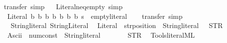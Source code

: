 \begin{isabellebody}
\ transfer\ simp\isanewline
\isanewline
{}%
\endisatagproof
{\isafoldproof}%
%
\isadelimproof
%
\endisadelimproof
\ \isamarkupfalse%
\ Literal{\isacharunderscore}{\kern0pt}neq{\isacharunderscore}{\kern0pt}empty\ {\isacharbrackleft}{\kern0pt}simp{\isacharbrackright}{\kern0pt}{\isacharcolon}{\kern0pt}\isanewline
\ \ {\isachardoublequoteopen}Literal\ b{}\ b{}\ b{}\ b{}\ b{}\ b{}\ b{}\ s\ {\isasymnoteq}\ empty{\isacharunderscore}{\kern0pt}literal{\isachardoublequoteclose}\isanewline
%
\isadelimproof
\ \ %
\endisadelimproof
%
\isatagproof
{}\isamarkupfalse%
\ transfer\ simp%
\endisatagproof
{\isafoldproof}%
%
\isadelimproof
\isanewline
%
\endisadelimproof
\isanewline
{}\isamarkupfalse%
\isanewline
\isanewline
{}\isamarkupfalse%
\ {\isachardoublequoteopen}{}\ {\isacharcolon}{\kern0pt}{\isacharcolon}{\kern0pt}\ String{\isachardot}{\kern0pt}literal{\isachardoublequoteclose}\ String{\isachardot}{\kern0pt}Literal\isanewline
\isanewline
{}\isamarkupfalse%
\isanewline
\ \ {\isachardoublequoteopen}{\isacharunderscore}{\kern0pt}Literal{\isachardoublequoteclose}\ {\isacharcolon}{\kern0pt}{\isacharcolon}{\kern0pt}\ {\isachardoublequoteopen}str{\isacharunderscore}{\kern0pt}position\ {\isasymRightarrow}\ String{\isachardot}{\kern0pt}literal{\isachardoublequoteclose}\ \ \ {\isacharparenleft}{\kern0pt}{\isachardoublequoteopen}STR\ {\isacharunderscore}{\kern0pt}{\isachardoublequoteclose}{\isacharparenright}{\kern0pt}\isanewline
\ \ {\isachardoublequoteopen}{\isacharunderscore}{\kern0pt}Ascii{\isachardoublequoteclose}\ {\isacharcolon}{\kern0pt}{\isacharcolon}{\kern0pt}\ {\isachardoublequoteopen}num{\isacharunderscore}{\kern0pt}const\ {\isasymRightarrow}\ String{\isachardot}{\kern0pt}literal{\isachardoublequoteclose}\ \ \ \ \ \ \ \ {\isacharparenleft}{\kern0pt}{\isachardoublequoteopen}STR\ {\isacharunderscore}{\kern0pt}{\isachardoublequoteclose}{\isacharparenright}{\kern0pt}\isanewline
%
\isadelimML
\isanewline
%
\endisadelimML
%
\isatagML
{}\isamarkupfalse%
\ {\isacartoucheopen}Tools{\isacharslash}{\kern0pt}literal{\isachardot}{\kern0pt}ML{\isacartoucheclose}%
\endisatagML
{\isafoldML}%
%
\isadelimML
%
\endisadelimML
%
\isadelimdocument
%
\endisadelimdocument
%
\isatagdocument
%
\isamarkuptrue%
%
\endisatagdocument
{\isafolddocument}%
%
\isadelimdocument
%
\endisadelimdocument

\end{isabellebody}
